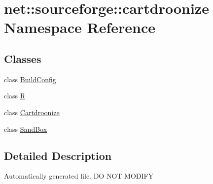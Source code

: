 \hypertarget{namespacenet_1_1sourceforge_1_1cartdroonize}{
\section{net::sourceforge::cartdroonize Namespace Reference}
\label{namespacenet_1_1sourceforge_1_1cartdroonize}
}
\subsection*{Classes}
\begin{DoxyCompactItemize}
\item 
class \hyperlink{classnet_1_1sourceforge_1_1cartdroonize_1_1BuildConfig}{BuildConfig}
\item 
class \hyperlink{classnet_1_1sourceforge_1_1cartdroonize_1_1R}{R}
\item 
class \hyperlink{classnet_1_1sourceforge_1_1cartdroonize_1_1Cartdroonize}{Cartdroonize}
\item 
class \hyperlink{classnet_1_1sourceforge_1_1cartdroonize_1_1SandBox}{SandBox}
\end{DoxyCompactItemize}


\subsection{Detailed Description}
Automatically generated file. DO NOT MODIFY 